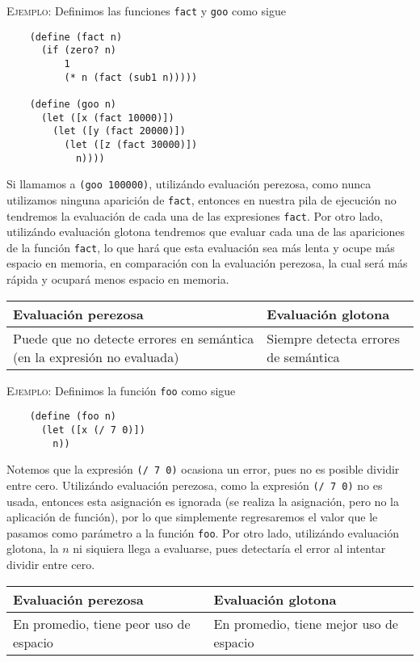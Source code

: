 \documentclass[letterpaper,11pt]{article}
\begin{document}
\textsc{Ejemplo:} Definimos las funciones \texttt{fact} y \texttt{goo} como 
sigue 
\begin{verbatim}
    (define (fact n) 
      (if (zero? n)
          1
          (* n (fact (sub1 n)))))
          
    (define (goo n)
      (let ([x (fact 10000)])
        (let ([y (fact 20000)])
          (let ([z (fact 30000)])
            n))))
\end{verbatim}

Si llamamos a \texttt{(goo 100000)}, utilizándo evaluación perezosa, como 
nunca utilizamos ninguna aparición de \texttt{fact}, entonces en nuestra 
pila de ejecución no tendremos la evaluación de cada una de las expresiones 
\texttt{fact}. Por otro lado, utilizándo evaluación glotona tendremos que 
evaluar cada una de las apariciones de la función \texttt{fact}, lo que 
hará que esta evaluación sea más lenta y ocupe más espacio en memoria, en 
comparación con la evaluación perezosa, la cual será más rápida y ocupará 
menos espacio en memoria.

\begin{table}[h]
    \centering  
    \begin{tabular}{|L|L|}
        \hline
        Evaluación perezosa & Evaluación glotona \\
        \hline 
        Puede que no detecte errores en semántica (en la expresión no 
        evaluada) & Siempre detecta errores de semántica \\
        \hline
    \end{tabular}
\end{table}

\textsc{Ejemplo:} Definimos la función \texttt{foo} como sigue
\begin{verbatim}
    (define (foo n)
      (let ([x (/ 7 0)])
        n))
\end{verbatim}

Notemos que la expresión \texttt{(/ 7 0)} ocasiona un error, pues no es posible 
dividir entre cero. Utilizándo evaluación perezosa, como la expresión 
\texttt{(/ 7 0)} no es usada, entonces esta asignación es ignorada (se realiza 
la asignación, pero no la aplicación de función), por lo que simplemente 
regresaremos el valor que le pasamos como parámetro a la función \texttt{foo}.
Por otro lado, utilizándo evaluación glotona, la $n$ ni siquiera llega a 
evaluarse, pues detectaría el error al intentar dividir entre cero.

\begin{table}[h]
    \centering  
    \begin{tabular}{|L|L|}
        \hline
        Evaluación perezosa & Evaluación glotona \\
        \hline 
        En promedio, tiene peor uso de espacio & En promedio, tiene mejor uso
        de espacio \\
        \hline
    \end{tabular}
\end{table}
\end{document}
